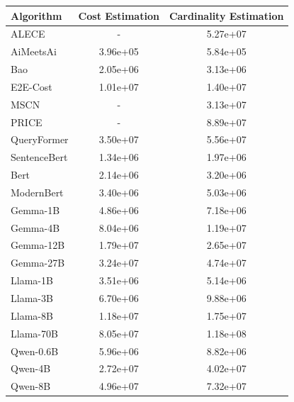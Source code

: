 \begin{tabular}{lcc}

\toprule

Algorithm & Cost Estimation & Cardinality Estimation \\

\midrule

ALECE & - & 5.27e+07 \\
AiMeetsAi & 3.96e+05 & 5.84e+05 \\
Bao & 2.05e+06 & 3.13e+06 \\
E2E-Cost & 1.01e+07 & 1.40e+07 \\
MSCN & - & 3.13e+07 \\
PRICE & - & 8.89e+07 \\
QueryFormer & 3.50e+07 & 5.56e+07 \\
\midrule

SentenceBert & 1.34e+06 & 1.97e+06 \\
Bert & 2.14e+06 & 3.20e+06 \\
ModernBert & 3.40e+06 & 5.03e+06 \\
Gemma-1B & 4.86e+06 & 7.18e+06 \\
Gemma-4B & 8.04e+06 & 1.19e+07 \\
Gemma-12B & 1.79e+07 & 2.65e+07 \\
Gemma-27B & 3.24e+07 & 4.74e+07 \\
Llama-1B & 3.51e+06 & 5.14e+06 \\
Llama-3B & 6.70e+06 & 9.88e+06 \\
Llama-8B & 1.18e+07 & 1.75e+07 \\
Llama-70B & 8.05e+07 & 1.18e+08 \\
Qwen-0.6B & 5.96e+06 & 8.82e+06 \\
Qwen-4B & 2.72e+07 & 4.02e+07 \\
Qwen-8B & 4.96e+07 & 7.32e+07 \\

\bottomrule
\end{tabular}